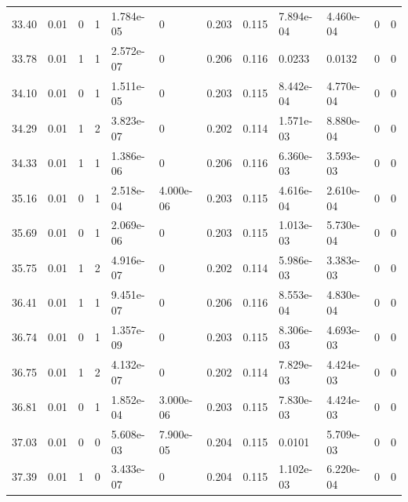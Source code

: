 \documentclass[preview]{standalone}
\begin{document}
{{{\begin{tabular}{L{1.2cm}C{1.2cm} C{0.3cm}C{0.5cm} C{1.4cm}C{1.4cm} C{1.4cm}C{1.4cm} C{1.6cm}C{1.6cm} C{1.6cm}C{1.6cm}}
  33.40  &  0.01  & 0     &  1 &  1.784e-05  & 0  &  0.203&   0.115& 7.894e-04 & 4.460e-04   &  0 & 0  \\ 
  33.78  &  0.01  & 1     &  1 &  2.572e-07  & 0  &  0.206&   0.116& 0.0233 & 0.0132   &  0 & 0  \\ 
  34.10  &  0.01  & 0     &  1 &  1.511e-05  & 0  &  0.203&   0.115& 8.442e-04 & 4.770e-04   &  0 & 0  \\ 
  34.29  &  0.01  & 1     &  2 &  3.823e-07  & 0  &  0.202&   0.114& 1.571e-03 & 8.880e-04   &  0 & 0  \\ 
  34.33  &  0.01  & 1     &  1 &  1.386e-06  & 0  &  0.206&   0.116& 6.360e-03 & 3.593e-03   &  0 & 0  \\ 
  35.16  &  0.01  & 0     &  1 &  2.518e-04  & 4.000e-06  &  0.203&   0.115& 4.616e-04 & 2.610e-04   &  0 & 0  \\ 
  35.69  &  0.01  & 0     &  1 &  2.069e-06  & 0  &  0.203&   0.115& 1.013e-03 & 5.730e-04   &  0 & 0  \\ 
  35.75  &  0.01  & 1     &  2 &  4.916e-07  & 0  &  0.202&   0.114& 5.986e-03 & 3.383e-03   &  0 & 0  \\ 
  36.41  &  0.01  & 1     &  1 &  9.451e-07  & 0  &  0.206&   0.116& 8.553e-04 & 4.830e-04   &  0 & 0  \\ 
  36.74  &  0.01  & 0     &  1 &  1.357e-09  & 0  &  0.203&   0.115& 8.306e-03 & 4.693e-03   &  0 & 0  \\ 
  36.75  &  0.01  & 1     &  2 &  4.132e-07  & 0  &  0.202&   0.114& 7.829e-03 & 4.424e-03   &  0 & 0  \\ 
  36.81  &  0.01  & 0     &  1 &  1.852e-04  & 3.000e-06  &  0.203&   0.115& 7.830e-03 & 4.424e-03   &  0 & 0  \\ 
  37.03  &  0.01  & 0     &  0 &  5.608e-03  & 7.900e-05  &  0.204&   0.115& 0.0101 & 5.709e-03   &  0 & 0  \\ 
  37.39  &  0.01  & 1     &  0 &  3.433e-07  & 0  &  0.204&   0.115& 1.102e-03 & 6.220e-04   &  0 & 0  \\ 
\hline 
\end{tabular} 

}}}
\end{document}
